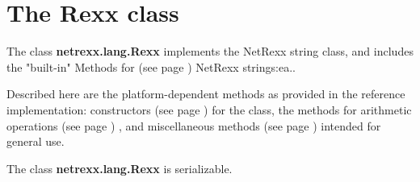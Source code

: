 \chapter{The Rexx class}\label{"id"}
 
The class \textbf{netrexx.lang.Rexx} implements the NetRexx string
class, and includes the "built-in"  Methods for (see page \pageref{refbmeth}) 
NetRexx strings:ea..
 
Described here are the platform-dependent methods as provided in
the reference implementation:  constructors (see page \pageref{refrexxcon})  for the
class, the methods for  arithmetic operations (see page \pageref{refrexxops}) , and
 miscellaneous methods (see page \pageref{refrexxmis})  intended for general
use.
 
The class \textbf{netrexx.lang.Rexx} is serializable.
